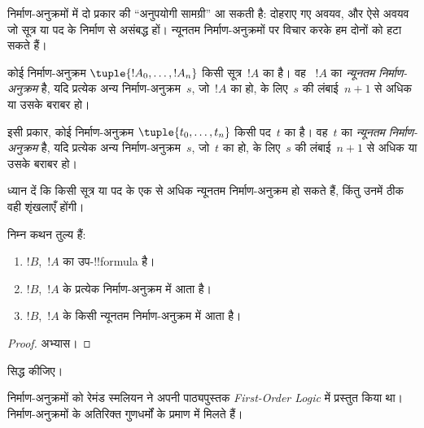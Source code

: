 \documentclass[../../../include/open-logic-section]{subfiles}
\begin{document}
निर्माण-अनुक्रमों में दो प्रकार की ``अनुपयोगी सामग्री'' आ सकती है: दोहराए गए
अवयव, और ऐसे अवयव जो सूत्र या पद के निर्माण से असंबद्ध हों। न्यूनतम
निर्माण-अनुक्रमों पर विचार करके हम दोनों को हटा सकते हैं।

\begin{defn}[न्यूनतम निर्माण-अनुक्रम]
कोई निर्माण-अनुक्रम $\tuple{!A_0, \ldots, !A_n}$ किसी सूत्र~$!A$ का है। वह
~$!A$ का \emph{न्यूनतम निर्माण-अनुक्रम} है, यदि प्रत्येक अन्य निर्माण-अनुक्रम~$s$,
जो~$!A$ का हो, के लिए~$s$ की लंबाई~$n+1$ से अधिक या उसके बराबर हो।

इसी प्रकार, कोई निर्माण-अनुक्रम $\tuple{t_0, \ldots, t_n}$ किसी पद~$t$ का है।
वह~$t$ का \emph{न्यूनतम निर्माण-अनुक्रम} है, यदि प्रत्येक अन्य निर्माण-अनुक्रम~$s$,
जो~$t$ का हो, के लिए~$s$ की लंबाई~$n+1$ से अधिक या उसके बराबर हो।
\end{defn}

ध्यान दें कि किसी सूत्र या पद के एक से अधिक न्यूनतम निर्माण-अनुक्रम हो सकते
हैं, किंतु उनमें ठीक वही शृंखलाएँ होंगी।

\begin{prop}
निम्न कथन तुल्य हैं:
\begin{enumerate}
    \item $!B$,~$!A$ का उप-!!{formula} है।
    \item $!B$,~$!A$ के प्रत्येक निर्माण-अनुक्रम में आता है।
    \item $!B$,~$!A$ के किसी न्यूनतम निर्माण-अनुक्रम में आता है।
\end{enumerate}
\end{prop}

\begin{proof}
अभ्यास।
\end{proof}

\begin{prob}
 सिद्ध कीजिए।
\end{prob}

\begin{history}
निर्माण-अनुक्रमों को रेमंड स्मलियन ने अपनी पाठ्यपुस्तक \emph{First-Order
Logic} \citep{Smullyan1968} में प्रस्तुत किया था। निर्माण-अनुक्रमों के
अतिरिक्त गुणधर्मों के प्रमाण \citet{Zuckerman1973} में मिलते हैं।
\end{history}
\end{document}
